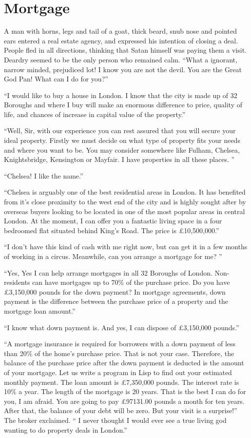 \documentclass[a4paper,12pt]{book}
\begin{document}
\section{Mortgage}
A man with horns, legs and tail of a goat,
thick beard, snub nose and pointed ears entered
a real estate agency, and expressed his intention
of closing a deal. People fled in all directions,
thinking that Satan himself was paying them a visit.
Deardry seemed to be the only person who remained
calm. “What a ignorant, narrow minded, prejudiced
lot! I know you are not the devil. You are the
Great God Pan! What can I do for you?”

“I would like to buy a house in London.
I know that the city is made up of 32 Boroughs
and where I buy will make an enormous difference
to price, quality of life, and chances of increase
in capital value of the property.”

“Well, Sir, with our experience you can rest
assured that you will secure your ideal property.
Firstly we must decide on what type of property
fits your needs and where you want to be. You
may consider somewhere like Fulham, Chelsea,
Knightsbridge, Kensington or Mayfair.
I have properties in all these places. ”

“Chelsea! I like the name.”

“Chelsea is arguably one of the best residential
areas in London. It has benefited from it’s close
proximity to the west end of the city and is highly
sought after by overseas buyers looking to be located
in one of the most popular areas in central London.
At the moment, I can offer you a fantastic living
space in a four bedroomed flat situated behind
King's Road. The price is £10,500,000.”

“I don't have this kind of cash with me right now,
but can get it in a few months of working in a
circus. Meanwhile, can you arrange a mortgage for me? ”

“Yes, Yes I can help arrange mortgages in all 32 Boroughs
of London. Non-residents can have mortgages up to 70\% of
the purchase price. Do you have £3,150,000 pounds for the
down payment? In mortgage agreements, down payment is
the difference between the purchase price of a property
and the mortgage loan amount.”

“I know what down payment is. And yes, I can dispose
of £3,150,000 pounds.”

“A mortgage insurance is required for borrowers with
a down payment of less than 20\% of the home's purchase
price. That is not your case. Therefore, the balance of
the purchase price after the down payment is deducted
is the amount of your mortgage. Let us write a program
in Lisp to find out your estimated monthly payment.
The loan amount is £7,350,000 pounds. The interest rate
is 10\% a year. The length of the mortgage is 20 years.
That is the best I can do for you, I am afraid.
You are going to pay £97131.00 pounds a month for
ten years. After that, the balance of your debt
will be zero. But your visit is a surprise!”
The broker exclaimed. “ I never thought I would
ever see a true living god wanting to do property
deals in London.”
\end{document}
